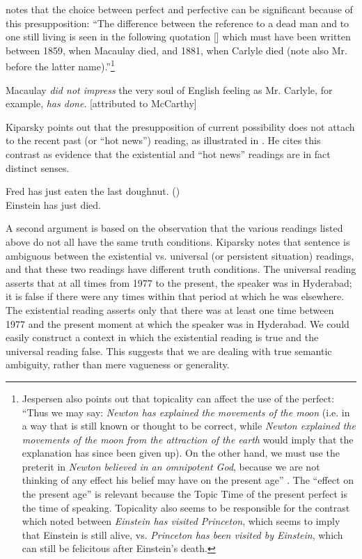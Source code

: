 \citet[66--67]{Jespersen1931} notes that the choice between perfect and perfective can be significant because of this presupposition: “The difference between the reference to a dead man and to one still living is seen in the following quotation [] which must have been written between 1859, when Macaulay died, and 1881, when Carlyle died (note also Mr. before the latter name).”\footnote{Jespersen also points out that topicality can affect the use of the perfect: “Thus we may say: \textit{Newton has explained the movements of the moon} (i.e. in a way that is still known or thought to be correct, while \textit{Newton explained the movements of the moon from the attraction of the earth} would imply that the explanation has since been given up). On the other hand, we must use the preterit in \textit{Newton believed in an omnipotent God}, because we are not thinking of any effect his belief may have on the present age” \citep[66]{Jespersen1931}. The “effect on the present age” is relevant because the Topic Time of the present perfect is the time of speaking. Topicality also seems to be responsible for the contrast which \citet{Chomsky1970} noted between \textit{Einstein has visited Princeton}, which seems to imply that Einstein is still alive, vs. \textit{Princeton has been visited by Einstein}, which can still be felicitous after Einstein’s death.}


\ea
Macaulay \textit{did not impress} the very soul of English feeling as Mr. Carlyle, for example, \textit{has done}. [attributed to McCarthy]
\z


Kiparsky points out that the presupposition of current possibility does not attach to the recent past (or “hot news”) reading, as illustrated in . He cites this contrast as evidence that the existential and “hot news” readings are in fact distinct senses.


\ea
\ea Fred has just eaten the last doughnut.  (\citealt{Kiparsky2002})\\
\ex Einstein has just died.
                       \z
\z


A second argument is based on the observation that the various readings listed above do not all have the same truth conditions. Kiparsky notes that sentence  is ambiguous between the existential vs. universal (or persistent situation) readings, and that these two readings have different truth conditions. The universal reading asserts that at all times from 1977 to the present, the speaker was in Hyderabad; it is false if there were any times within that period at which he was elsewhere. The existential reading asserts only that there was at least one time between 1977 and the present moment at which the speaker was in Hyderabad. We could easily construct a context in which the existential reading is true and the universal reading false. This suggests that we are dealing with true semantic ambiguity, rather than mere vagueness or generality.


